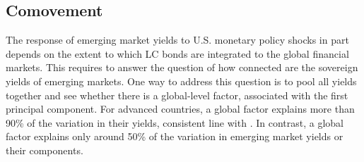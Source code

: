 {%


\subsection{Comovement} \label{sec:globalPC}
\iftoggle{toclinks}{\gototoc}{} %


The response of emerging market yields to U.S. monetary policy shocks in part depends on the extent to which LC bonds are integrated to the global financial markets.
This requires to answer the question of how connected are the sovereign yields of emerging markets.
One way to address this question is to pool all yields together and see whether there is a global-level factor, associated with the first principal component.
For advanced countries, a global factor explains more than 90\% of the variation in their yields, consistent line with \cite{DahlquistHasseltoft:2016}.
In contrast, a global factor explains only around 50\% of the variation in emerging market yields or their components.

}
